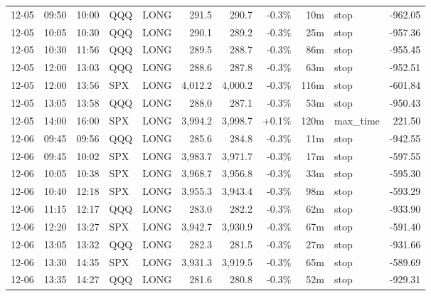 \documentclass[11pt,a4paper,twoside]{article}
\begin{document}
\begin{center}
\begin{longtable}{>{\color{txtmain}}l l l l l r r r r >{\color{txtmain}}l r}
12-05 & 09:50 & 10:00 & QQQ & LONG & 291.5 & 290.7 & \textcolor{lossred}{-0.3\%} & 10m & stop & \textcolor{lossred}{-962.05} \\
12-05 & 10:05 & 10:30 & QQQ & LONG & 290.1 & 289.2 & \textcolor{lossred}{-0.3\%} & 25m & stop & \textcolor{lossred}{-957.36} \\
12-05 & 10:30 & 11:56 & QQQ & LONG & 289.5 & 288.7 & \textcolor{lossred}{-0.3\%} & 86m & stop & \textcolor{lossred}{-955.45} \\
12-05 & 12:00 & 13:03 & QQQ & LONG & 288.6 & 287.8 & \textcolor{lossred}{-0.3\%} & 63m & stop & \textcolor{lossred}{-952.51} \\
12-05 & 12:00 & 13:56 & SPX & LONG & 4,012.2 & 4,000.2 & \textcolor{lossred}{-0.3\%} & 116m & stop & \textcolor{lossred}{-601.84} \\
12-05 & 13:05 & 13:58 & QQQ & LONG & 288.0 & 287.1 & \textcolor{lossred}{-0.3\%} & 53m & stop & \textcolor{lossred}{-950.43} \\
12-05 & 14:00 & 16:00 & SPX & LONG & 3,994.2 & 3,998.7 & \textcolor{wingreen}{+0.1\%} & 120m & max\_time & \textcolor{wingreen}{221.50} \\
12-06 & 09:45 & 09:56 & QQQ & LONG & 285.6 & 284.8 & \textcolor{lossred}{-0.3\%} & 11m & stop & \textcolor{lossred}{-942.55} \\
12-06 & 09:45 & 10:02 & SPX & LONG & 3,983.7 & 3,971.7 & \textcolor{lossred}{-0.3\%} & 17m & stop & \textcolor{lossred}{-597.55} \\
12-06 & 10:05 & 10:38 & SPX & LONG & 3,968.7 & 3,956.8 & \textcolor{lossred}{-0.3\%} & 33m & stop & \textcolor{lossred}{-595.30} \\
12-06 & 10:40 & 12:18 & SPX & LONG & 3,955.3 & 3,943.4 & \textcolor{lossred}{-0.3\%} & 98m & stop & \textcolor{lossred}{-593.29} \\
12-06 & 11:15 & 12:17 & QQQ & LONG & 283.0 & 282.2 & \textcolor{lossred}{-0.3\%} & 62m & stop & \textcolor{lossred}{-933.90} \\
12-06 & 12:20 & 13:27 & SPX & LONG & 3,942.7 & 3,930.9 & \textcolor{lossred}{-0.3\%} & 67m & stop & \textcolor{lossred}{-591.40} \\
12-06 & 13:05 & 13:32 & QQQ & LONG & 282.3 & 281.5 & \textcolor{lossred}{-0.3\%} & 27m & stop & \textcolor{lossred}{-931.66} \\
12-06 & 13:30 & 14:35 & SPX & LONG & 3,931.3 & 3,919.5 & \textcolor{lossred}{-0.3\%} & 65m & stop & \textcolor{lossred}{-589.69} \\
12-06 & 13:35 & 14:27 & QQQ & LONG & 281.6 & 280.8 & \textcolor{lossred}{-0.3\%} & 52m & stop & \textcolor{lossred}{-929.31} \\

\end{longtable}
\end{center}
\end{document}
